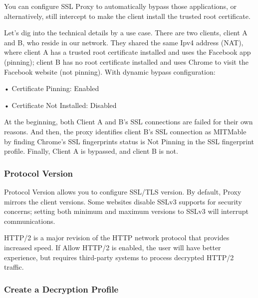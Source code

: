 You can configure SSL Proxy to automatically bypass those applications, or alternatively, still intercept to make the client install the trusted root certificate.


Let’s dig into the technical details by a use case. There are two clients, client A and B, who reside in our network. 
They shared the same Ipv4 address (NAT), where client A has a trusted root certificate installed and uses the Facebook app (pinning); 
client B has no root certificate installed and uses Chrome to visit the Facebook website (not pinning). With dynamic bypass configuration:


• Certificate Pinning: Enabled


• Certificate Not Installed: Disabled


At the beginning, both Client A and B’s SSL connections are failed for their own reasons. And then, the proxy identifies client B’s SSL connection as MITMable by finding Chrome’s SSL fingerprints status is Not Pinning in the SSL fingerprint profile. Finally, Client A is bypassed, and client B is not.

\subsubsection*{\hypertarget{link:Protocol Version}{Protocol Version}}
\label{sec:decrypt:profile:decryptionprofile:version}

Protocol Version allows you to configure SSL/TLS version. By default, Proxy mirrors the client versions. 
Some websites disable SSLv3 supports for security concerns; setting both minimum and maximum versions to SSLv3 will interrupt communications.


HTTP/2 is a major revision of the HTTP network protocol that provides increased speed. 
If Allow HTTP/2 is enabled, the user will have better experience, but requires third-party systems to process decrypted HTTP/2 traffic.

\subsubsection*{\hypertarget{link:Create a Decryption Profile}{Create a Decryption Profile}}
\label{sec:decrypt:profile:decryptionprofile:create}

